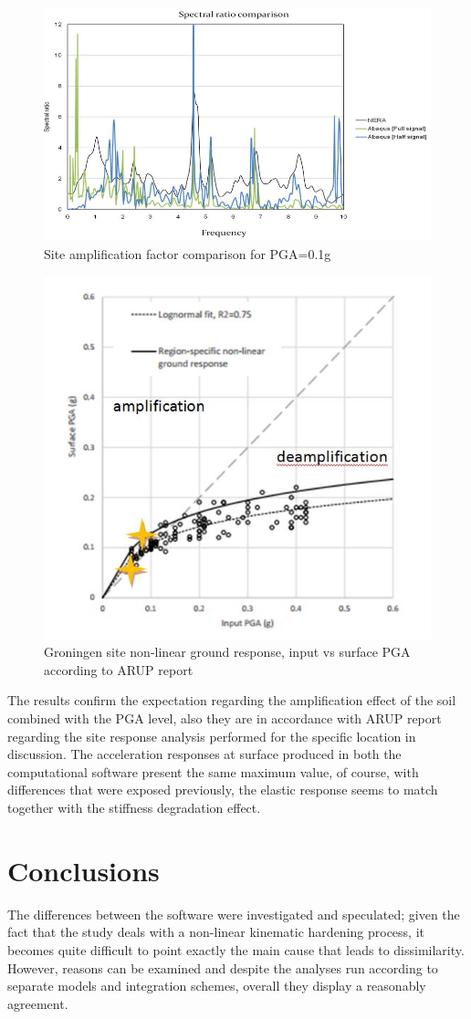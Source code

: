 	\begin{figure}[h!]
		\centering
		\includegraphics[width=0.7\linewidth]{"spectral2"}
		\caption{Site amplification factor comparison for PGA=0.1g}
		\label{SAF}
	\end{figure}
	\begin{figure}[h!]
		\centering
		\includegraphics[width=0.7\linewidth]{"ARUP"}
		\caption{Groningen site non-linear ground response, input vs surface PGA according to ARUP report}
		\label{ARUP}
	\end{figure}
	
	The results confirm the expectation regarding the amplification effect of the soil combined with the PGA level, also they are in accordance with ARUP report regarding the site response analysis performed for the specific location in discussion. The acceleration responses at surface produced in both the computational software present the same maximum value, of course, with differences that were exposed previously, the elastic response seems to match together with the stiffness degradation effect. 
	
	\section{Conclusions}
	The differences between the software were investigated and speculated; given the fact that the study deals with a non-linear kinematic hardening process, it becomes quite difficult to point exactly the main cause that leads to dissimilarity. However, reasons can be examined and despite the analyses run according to separate models and integration schemes, overall they display a reasonably agreement.
	
